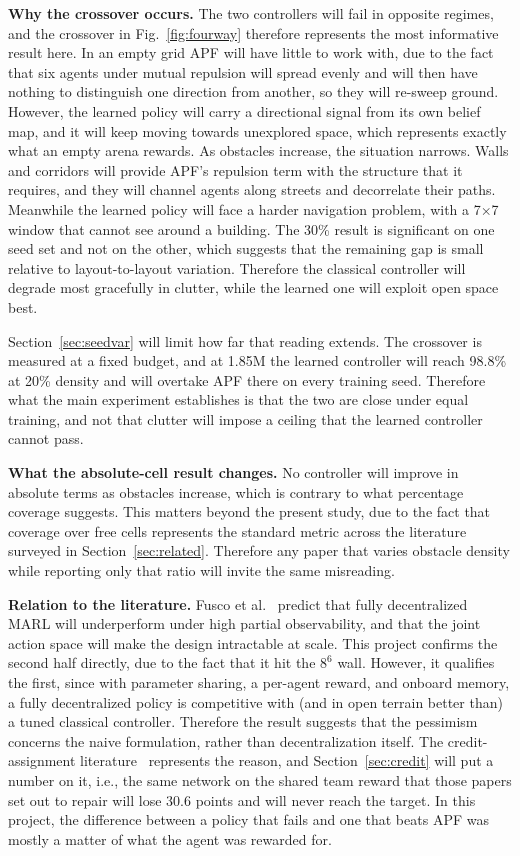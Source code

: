 \documentclass[a4paper, 10pt, conference]{ieeeconf}
\begin{document}
\textbf{Why the crossover occurs.} The two controllers will fail in
opposite regimes, and the crossover in Fig.~\ref{fig:fourway}
therefore represents the most informative result here. In an empty
grid APF will have little to work with, due to the fact that six
agents under mutual repulsion will spread evenly and will then have
nothing to distinguish one direction from another, so they will
re-sweep ground. However, the learned policy will carry a directional
signal from its own belief map, and it will keep moving towards
unexplored space, which represents exactly what an empty arena
rewards. As obstacles increase, the situation narrows. Walls and
corridors will provide APF's repulsion term with the structure that it
requires, and they will channel agents along streets and decorrelate
their paths. Meanwhile the learned policy will face a harder
navigation problem, with a 7$\times$7 window that cannot see around a
building. The 30\% result is significant on one seed set and not on
the other, which suggests that the remaining gap is small relative to
layout-to-layout variation. Therefore the classical controller will
degrade most gracefully in clutter, while the learned one will exploit
open space best.

Section~\ref{sec:seedvar} will limit how far that reading extends. The
crossover is measured at a fixed budget, and at 1.85M the learned
controller will reach 98.8\% at 20\% density and will overtake APF
there on every training seed. Therefore what the main experiment
establishes is that the two are close under equal training, and not
that clutter will impose a ceiling that the learned controller cannot
pass.

\textbf{What the absolute-cell result changes.} No controller will
improve in absolute terms as obstacles increase, which is contrary to
what percentage coverage suggests. This matters beyond the present
study, due to the fact that coverage over free cells represents the
standard metric across the literature surveyed in
Section~\ref{sec:related}. Therefore any paper that varies obstacle
density while reporting only that ratio will invite the same
misreading.

\textbf{Relation to the literature.} Fusco et al.~\cite{fusco2025}
predict that fully decentralized MARL will underperform under high
partial observability, and that the joint action space will make the
design intractable at scale. This project confirms the second half
directly, due to the fact that it hit the $8^6$ wall. However, it
qualifies the first, since with parameter sharing, a per-agent reward,
and onboard memory, a fully decentralized policy is competitive with
(and in open terrain better than) a tuned classical controller.
Therefore the result suggests that the pessimism concerns the naive
formulation, rather than decentralization itself. The
credit-assignment
literature~\cite{foerster2018,sunehag2018,rashid2018} represents the
reason, and Section~\ref{sec:credit} will put a number on it, i.e.,
the same network on the shared team reward that those papers set out
to repair will lose 30.6 points and will never reach the target. In
this project, the difference between a policy that fails and one that
beats APF was mostly a matter of what the agent was rewarded for.
\end{document}
